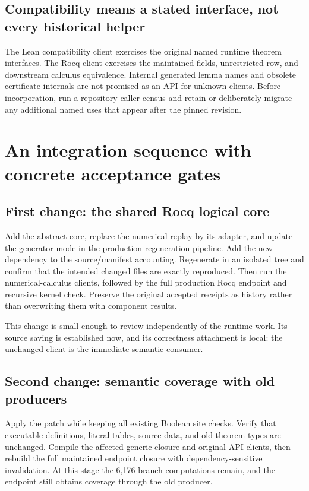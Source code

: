 \documentclass[11pt,letterpaper]{article}
\theoremstyle{definition}\newtheorem{definition}[theorem]{Definition}
\theoremstyle{remark}\newtheorem{remark}[theorem]{Remark}
\newcommand{\code}[1]{\texttt{\detokenize{#1}}}
\begin{document}
\subsection{Compatibility means a stated interface, not every historical helper}

The Lean compatibility client exercises the original named runtime theorem interfaces. The Rocq client exercises the maintained \code{DomImp} fields, unrestricted row, and downstream calculus equivalence. Internal generated lemma names and obsolete certificate internals are not promised as an API for unknown clients. Before incorporation, run a repository caller census and retain or deliberately migrate any additional named uses that appear after the pinned revision.

\section{An integration sequence with concrete acceptance gates}

\subsection{First change: the shared Rocq logical core}

Add the abstract core, replace the numerical replay by its adapter, and update the generator mode in the production regeneration pipeline. Add the new dependency to the source/manifest accounting. Regenerate in an isolated tree and confirm that the intended changed files are exactly reproduced. Then run the numerical-calculus clients, followed by the full production Rocq endpoint and recursive kernel check. Preserve the original accepted receipts as history rather than overwriting them with component results.

This change is small enough to review independently of the runtime work. Its source saving is established now, and its correctness attachment is local: the unchanged \code{ThmDom} client is the immediate semantic consumer.

\subsection{Second change: semantic coverage with old producers}

Apply the \code{KSim} patch while keeping all existing Boolean site checks. Verify that executable definitions, literal tables, source data, and old theorem types are unchanged. Compile the affected generic closure and original-API clients, then rebuild the full maintained endpoint closure with dependency-sensitive invalidation. At this stage the 6,176 branch computations remain, and the endpoint still obtains coverage through the old producer.
\end{document}
